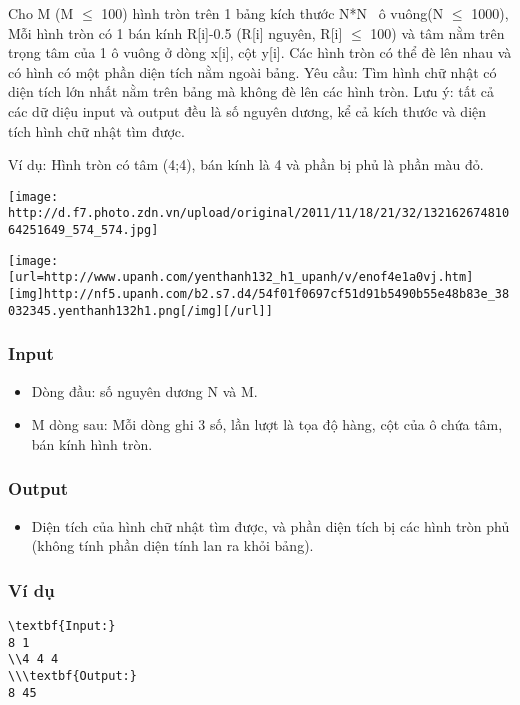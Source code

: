 



   Cho M (M $\le$  100) hình tròn trên 1 bảng kích thước N*N  ô vuông(N  $\le$  1000), Mỗi hình tròn có 1 bán kính R[i]-0.5 (R[i] nguyên, R[i]  $\le$  100) và tâm nằm trên  trọng tâm của 1 ô vuông ở dòng x[i], cột y[i]. Các hình tròn có thể đè lên nhau và có hình có một phần diện tích nằm ngoài bảng. Yêu cầu: Tìm hình chữ nhật có diện tích lớn nhất nằm trên bảng mà không đè lên các hình tròn. Lưu ý: tất cả các dữ diệu input và output đều là số nguyên dương, kể cả kích thước và diện tích hình chữ nhật tìm được.  

   Ví dụ: Hình tròn có tâm (4;4), bán kính là 4 và phần bị phủ là phần màu đỏ.  


\texttt{[image: http://d.f7.photo.zdn.vn/upload/original/2011/11/18/21/32/13216267481064251649\_574\_574.jpg]}


\texttt{[image: [url=http://www.upanh.com/yenthanh132\_h1\_upanh/v/enof4e1a0vj.htm][img]http://nf5.upanh.com/b2.s7.d4/54f01f0697cf51d91b5490b55e48b83e\_38032345.yenthanh132h1.png[/img][/url]]}



\subsubsection{   Input  }
\begin{itemize}
	\item     Dòng đầu: số nguyên dương N và M.   
\end{itemize}
\begin{itemize}
	\item     M dòng sau: Mỗi dòng ghi 3 số, lần lượt là tọa độ hàng, cột của ô chứa tâm, bán kính hình tròn.   
\end{itemize}

\subsubsection{   Output  }
\begin{itemize}
	\item 

       Diện tích của hình chữ nhật tìm được, và phần diện tích bị các hình tròn phủ (không tính phần diện tính lan ra khỏi bảng).      
\\
\end{itemize}

\subsubsection{   Ví dụ  }
\begin{verbatim}
\textbf{Input:}
8 1
\\4 4 4
\\\textbf{Output:}
8 45\end{verbatim}

